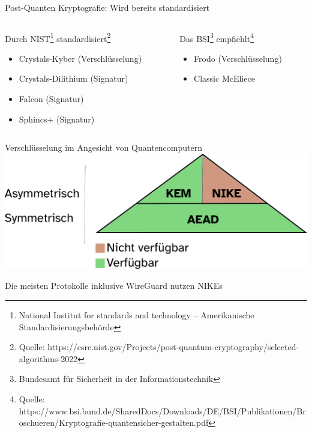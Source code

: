 \documentclass{rosenpass-beamer}
\begin{document}
\begin{frame}{Post-Quanten Kryptografie: Wird bereits standardisiert}

\begin{columns}[onlytextwidth]
\begin{column}{.30\textwidth}

\large Durch NIST\footnote{National Institut for standards and technology – Amerikanische Standardisierungsbehörde} standardisiert\footnote{Quelle: https://csrc.nist.gov/Projects/post-quantum-cryptography/selected-algorithms-2022} \normalsize

\vspace{2mm}

\begin{itemize}
    \item Crystals-Kyber (Verschlüsselung)
    \item Crystals-Dilithium (Signatur)
    \item Falcon (Signatur)
    \item Sphincs+ (Signatur)
\end{itemize}

\end{column}

\begin{column}{.30\textwidth}
\large Das BSI\footnote{Bundesamt für Sicherheit in der Informationstechnik} empfiehlt\footnote{Quelle: https://www.bsi.bund.de/SharedDocs/Downloads/DE/BSI/Publikationen/Broschueren/Kryptografie-quantensicher-gestalten.pdf} \normalsize

\vspace{2mm}

\begin{itemize}
    \item Frodo (Verschlüsselung)
    \item Classic McEliece
\end{itemize}

\end{column}
\end{columns}

\end{frame}

\begin{frame}{Verschlüsselung im Angesicht von Quantencomputern}
    \includegraphics[height=.6\textheight]{graphics/Primitivenpyramide.pdf}
      
    Die meisten Protokolle inklusive WireGuard nutzen NIKEs    
\end{frame}
\end{document}
